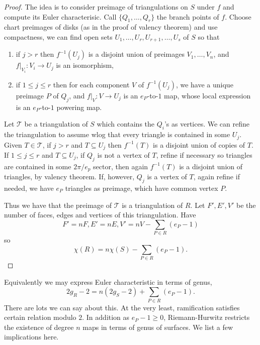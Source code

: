 \documentclass[a4paper]{article}
\begin{document}
\begin{proof}
  The idea is to consider preimage of triangulations on \(S\) under \(f\) and compute its Euler characterisic. Call \(\{Q_1, \dots, Q_r\}\) the branch points of \(f\). Choose chart preimages of disks (as in the proof of valency theorem) and use compactness, we can find open sets \(U_1, \dots, U_r, U_{r + 1}, \dots, U_s\) of \(S\) so that
  \begin{enumerate}
  \item if \(j > r\) then \(f^{-1}(U_j)\) is a disjoint union of preimages \(V_1, \dots, V_n\), and \(f|_{V_i}: V_i \to U_j\) is an isomorphism,
  \item if \(1 \leq j \leq r\) then for each component \(V\) of \(f^{-1}(U_j)\), we have a unique preimage \(P\) of \(Q_j\), and \(f|_V: V \to U_j\) is an \(e_P\)-to-\(1\) map, whose local expression is an \(e_P\)-to-\(1\) powering map.
  \end{enumerate}
  Let \(\mathcal T\) be a triangulation of \(S\) which contains the \(Q_i\)'s as vertices. We can refine the triangulation to assume wlog that every triangle is contained in some \(U_j\). Given \(T \in \mathcal T\), if \(j > r\) and \(T \subseteq U_j\) then \(f^{-1}(T)\) is a disjoint union of copies of \(T\). If \(1 \leq j \leq r\) and \(T \subseteq U_j\), if \(Q_j\) is not a vertex of \(T\), refine if necessary so triangles are contained in some \(2\pi/e_p\) sector, then again \(f^{-1}(T)\) is a disjoint union of triangles, by valency theorem. If, however, \(Q_j\) is a vertex of \(T\), again refine if needed, we have \(e_P\) triangles as preimage, which have common vertex \(P\).

  Thus we have that the preimage of \(\mathcal T\) is a triangulation of \(R\). Let \(F', E', V'\) be the number of faces, edges and vertices of this triangulation. Have
  \[
    F' = nF, E' = nE, V' = nV - \sum_{P \in R}(e_P - 1)
  \]
  so
  \[
    \chi(R) = n \chi(S) - \sum_{P \in R}(e_P - 1).
  \]
\end{proof}

\begin{remark}
  Equivalently we may express Euler characteristic in terms of genus,
  \[
    2g_R - 2 = n(2g_S - 2) + \sum_{P \in R}(e_P - 1).
  \]
  There are lots we can say about this. At the very least, ramification satisfies certain relation modulo \(2\). In addition as \(e_P - 1 \geq 0\), Riemann-Hurwitz restricts the existence of degree \(n\) maps in terms of genus of surfaces. We list a few implications here.
\end{remark}
\end{document}
